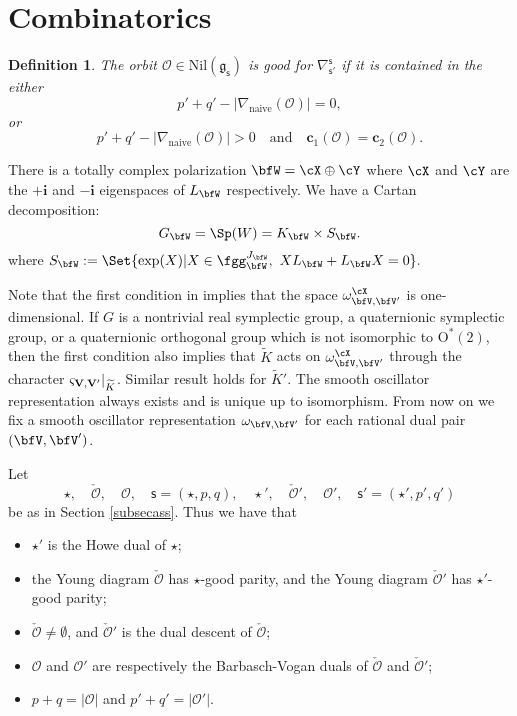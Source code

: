 \documentclass[12pt,a4paper]{amsart}
\def\abs#1{\left|{#1}\right|}
\newcommand{\CO}{{\mathcal {O}}}
\newcommand{\g}{\mathfrak g}
\def\DD{\nabla}
\numberwithin{equation}{section}
\newtheorem{defn}[thm]{Definition}
\theoremstyle{remark}
\def\abfV{\bfV'}
\def\mktvvp{\varsigma_{{\bf V},{\bf V}'}}
\begin{document}
\section{}



\section{Combinatorics}



\begin{defn}
The orbit $\CO\in \mathrm{Nil}(\g_\mathsf s)$ is good for $\DD_{\mathsf s'}^{\mathsf s}$ if it is contained in the either
\[
p'+q'-\abs{\DD_\mathrm{naive}(\CO)}= 0,
\]
or
\[
p'+q'-\abs{\DD_\mathrm{naive}(\CO)}>0\quad \textrm{and}\quad  \mathbf c_1(\CO)=\mathbf c_2(\CO).
\]

\end{defn}


There is a totally complex
polarization $\bfW = \cX\oplus \cY$ where $\cX$ and $\cY$ are the $+\mathbf i$ and $-\mathbf i$
eigenspaces  of $L_{\bfW}$ respectively.
We have a Cartan decomposition:
\[
   G_{\bfW}=\Sp(W)=K_{\bfW}\times S_{\bfW}.
\]
where
$
 S_{\bfW}:=\Set{\exp(X) | X\in \fgg_{\bfW}^{J_\bfW}, \ X L_{\bfW}+L_{\bfW} X=0}.
$



Note that the first condition in  implies that the space
$\omega_{\bfV,\abfV}^{\cX}$ is one-dimensional. If $G$ is a nontrivial real symplectic group, a quaternionic symplectic group, or a quaternionic orthogonal group which is not isomorphic to $\mathrm O^*(2)$, then the first condition also implies that $\widetilde K$ acts on $\omega_{\bfV,\abfV}^{\cX}$ through the character $\mktvvp|_{\widetilde K}$. Similar result holds for $\widetilde K'$.  The smooth oscillator representation always exists and  is unique up to
isomorphism. From now on we  fix a smooth oscillator representation
$\omega_{\bfV,\abfV}$ for each rational dual pair $(\bfV,\abfV)$.



Let
\[
\star, \quad \check \CO,  \quad\CO,  \quad\mathsf s=(\star, p,q),  \quad\star',  \quad \check \CO',  \quad\CO',  \quad \mathsf s'=(\star', p',q')
\]
be as in Section \ref{subsecass}. Thus we have that
\begin{itemize}
\item $\star'$ is the Howe dual of $\star$;
\item the Young diagram $\check \CO$ has $\star$-good parity, and the Young diagram $\check \CO'$ has $\star'$-good parity;
\item
 $\check \CO\neq \emptyset$, and $\check \CO' $ is  the dual descent of $\check \CO$;
 \item
  $\CO$ and $\CO'$ are respectively the Barbasch-Vogan duals of $\check \CO$ and $\check \CO'$;
  \item $ p+q=\abs{\CO}$ and $p'+q'=\abs{\CO'}$.
\end{itemize}
\end{document}
